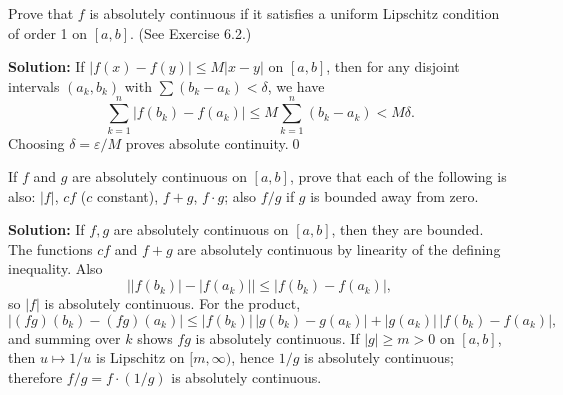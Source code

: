 \begin{problembox}
Prove that $f$ is absolutely continuous if it satisfies a uniform Lipschitz condition of order 1 on $[a, b]$. (See Exercise 6.2.)
\end{problembox}

\noindent\textbf{Solution:}
If $|f(x)-f(y)|\le M|x-y|$ on $[a,b]$, then for any disjoint intervals $(a_k,b_k)$ with $\sum(b_k-a_k)<\delta$, we have
\[\sum_{k=1}^n |f(b_k)-f(a_k)|\le M\sum_{k=1}^n(b_k-a_k)<M\delta.
\]
Choosing $\delta=\varepsilon/M$ proves absolute continuity.\qed


\begin{problembox}
If $f$ and $g$ are absolutely continuous on $[a, b]$, prove that each of the following is also: $|f|$, $cf$ ($c$ constant), $f + g$, $f \cdot g$; also $f/g$ if $g$ is bounded away from zero.
\end{problembox}

\noindent\textbf{Solution:}
If $f,g$ are absolutely continuous on $[a,b]$, then they are bounded. The functions $cf$ and $f+g$ are absolutely continuous by linearity of the defining inequality. Also
\[\big||f(b_k)|-|f(a_k)|\big|\le |f(b_k)-f(a_k)|,\]
so $|f|$ is absolutely continuous. For the product,
\[|(fg)(b_k)-(fg)(a_k)|\le |f(b_k)|\,|g(b_k)-g(a_k)|+|g(a_k)|\,|f(b_k)-f(a_k)|,\]
and summing over $k$ shows $fg$ is absolutely continuous. If $|g|\ge m>0$ on $[a,b]$, then $u\mapsto 1/u$ is Lipschitz on $[m,\infty)$, hence $1/g$ is absolutely continuous; therefore $f/g=f\cdot(1/g)$ is absolutely continuous.